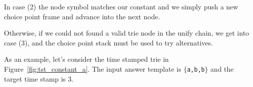 In case (2) the node symbol matches our constant and we simply push a new choice point frame and advance
into the next node.

Otherwise, if we could not found a valid trie node in the unify chain, we get into case (3), and the choice point
stack must be used to try alternatives.

As an example, let's consider the time stamped trie in Figure~\ref{fig:tst_constant_a}. The input
answer template is $\{$\texttt{a,b,b}$\}$ and the target time stamp is 3.

\begin{figure}
   \centering
   
   \vspace{40pt}\\
   
   \qquad
    \\
   

\end{figure}
